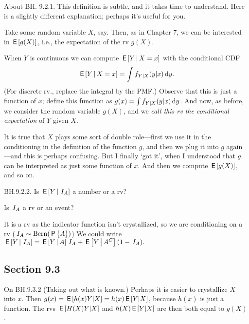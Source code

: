 \begin{remark} About BH. 9.2.1. This definition is subtle, and it takes time to understand.
Here is a slightly different explanation; perhaps it's useful for you.

Take some random variable $X$, say.
Then, as in Chapter 7,  we can be interested in  $\,\mathsf{E}\left[g(X)\right]$, i.e., the expectation of the rv $g(X)$.

When $Y$ is continuous we can compute $\,\mathsf{E}\left[Y \,\middle|\, X=x\right]$ with  the conditional CDF
\begin{align*}
\,\mathsf{E}\left[Y\,\middle|\, X=x \right] =\int f_{Y| X}(y | x) \,\textrm{d}y.
\end{align*}
(For discrete rv., replace the integral by the PMF.)
Observe that this is just a function of $x$; define this function as $g(x) = \int f_{Y| X}(y | x)\,\textrm{d}y$. And now, as before, we consider the random variable $g(X)$, and we  \emph{call this rv the conditional expectation} of $Y$ given $X$.

It is true that $X$ plays some sort of double role---first we use it in the conditioning in the definition of the function $g$, and then we plug it into  $g$ again---and this is perhaps confusing. But I finally `got  it', when I understood that $g$ can be interpreted as just some function of $x$. And then we compute $\,\mathsf{E}\left[g(X)\right]$, and so on.
\end{remark}



\begin{exercise}
BH.9.2.2. Is $\,\mathsf{E}\left[Y\,\middle|\, \,I_{A}\right]$ a number or a rv?
\begin{hint}
  Is $\,I_{A}$ a rv or an event?
\end{hint}
\begin{solution}
  It is a rv as the indicator function isn't crystallized, so we are conditioning on a rv ($\,I_{A} \sim \mathrm{Bern}(\,\mathsf{P}\left\{A\right\})$) We could write $\,\mathsf{E}\left[Y\,\middle|\, \,I_{A}\right] = \,\mathsf{E}\left[Y\,\middle|\, A\right]\,I_{A} + \,\mathsf{E}\left[Y\,\middle|\, A^C\right](1-\,I_{A}).$
\end{solution}
\end{exercise}


\subsection*{Section 9.3}
\label{sec:section-9.3}

\begin{remark}
On BH.9.3.2 (Taking out what is known.) Perhaps it is easier to crystallize  $X$ into $x$. Then $g(x) = \,\mathsf{E}\left[h(x) Y|X\right] = h(x) \,\mathsf{E}\left[Y|X\right]$, because $h(x)$ is just a function. The rvs $\,\mathsf{E}\left[H(X) Y|X\right]$ and $h(X) \,\mathsf{E}\left[Y|X\right]$ are then both  equal to $g(X)$.
\end{remark}


